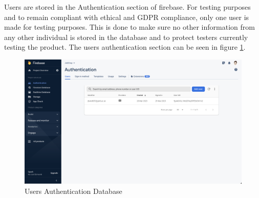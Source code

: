 \newpage
Users are stored in the Authentication section of firebase. For testing purposes and to remain compliant with ethical and GDPR compliance, only one user is made for testing purposes. This is done to make sure no other information from any other individual is stored in the database and to protect testers currently testing the product. The users authentication section can be seen in figure \ref{fig: authentication}.

\begin{figure}
    \centering
    \includegraphics[width = 140mm]{Figures/authentication.png}
    \caption{Users Authentication Database}
    \label{fig: authentication}
\end{figure}